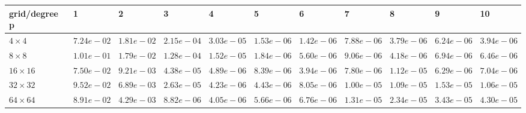\begin{tabular}{lllllllllll}
\hline
 grid/degree p   & 1          & 2          & 3          & 4          & 5          & 6          & 7          & 8          & 9          & 10         \\
\hline
 $4 \times 4$    & $7.24e-02$ & $1.81e-02$ & $2.15e-04$ & $3.03e-05$ & $1.53e-06$ & $1.42e-06$ & $7.88e-06$ & $3.79e-06$ & $6.24e-06$ & $3.94e-06$ \\
 $8 \times 8$    & $1.01e-01$ & $1.79e-02$ & $1.28e-04$ & $1.52e-05$ & $1.84e-06$ & $5.60e-06$ & $9.06e-06$ & $4.18e-06$ & $6.94e-06$ & $6.46e-06$ \\
 $16 \times 16$  & $7.50e-02$ & $9.21e-03$ & $4.38e-05$ & $4.89e-06$ & $8.39e-06$ & $3.94e-06$ & $7.80e-06$ & $1.12e-05$ & $6.29e-06$ & $7.04e-06$ \\
 $32 \times 32$  & $9.52e-02$ & $6.89e-03$ & $2.63e-05$ & $4.23e-06$ & $4.43e-06$ & $8.05e-06$ & $1.00e-05$ & $1.09e-05$ & $1.53e-05$ & $1.06e-05$ \\
 $64 \times 64$  & $8.91e-02$ & $4.29e-03$ & $8.82e-06$ & $4.05e-06$ & $5.66e-06$ & $6.76e-06$ & $1.31e-05$ & $2.34e-05$ & $3.43e-05$ & $4.30e-05$ \\
\hline
\end{tabular}